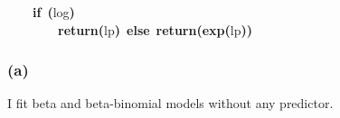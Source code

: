 \documentclass{article}
\makeatletter
\newcommand{\hlfunctioncall}[1]{\textcolor[rgb]{.5,0,.33}{\textbf{#1}}}%
\newcommand{\hlkeyword}[1]{\textbf{#1}}%
\newcommand{\hlsymbol}[1]{#1}%
\newcommand{\hlstd}[1]{\textcolor[rgb]{0,0,0}{#1}}%
\newenvironment{kframe}{%
 \def\FrameCommand##1{\hskip\@totalleftmargin \hskip-\fboxsep
 \colorbox{shadecolor}{##1}\hskip-\fboxsep
     \hskip-\linewidth \hskip-\@totalleftmargin \hskip\columnwidth}%
 \MakeFramed {\advance\hsize-\width
   \@totalleftmargin\z@ \linewidth\hsize
   \@setminipage}}%
 {\par\unskip\endMakeFramed}
\newenvironment{knitrout}{}{} %
\makeatother
\begin{document}
\begin{knitrout}
{\begin{kframe}
\begin{flushleft}
\hlstd{}{\ }{\ }{\ }{\ }\hlkeyword{if}{\ }\hlkeyword{(}\hlsymbol{log}\hlkeyword{)}\hspace*{\fill}\\
\hlstd{}{\ }{\ }{\ }{\ }{\ }{\ }{\ }{\ }\hlfunctioncall{return}\hlkeyword{(}\hlsymbol{lp}\hlkeyword{)}{\ }\hlkeyword{else}{\ }\hlfunctioncall{return}\hlkeyword{(}\hlfunctioncall{exp}\hlkeyword{(}\hlsymbol{lp}\hlkeyword{)}\hlkeyword{)}\hspace*{\fill}\\
\hlstd{}\hlkeyword{\usebox{\hlnormalsizeboxclosebrace}}\mbox{}
\normalfont
\end{flushleft}
\end{kframe}}
\end{knitrout}


\subsubsection*{(a)}

I fit beta and beta-binomial models without any predictor. 
\end{document}
